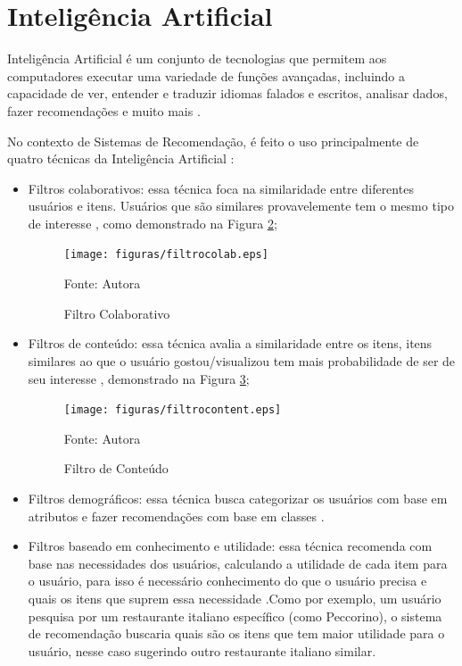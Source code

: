 \section{Inteligência Artificial}\label{sec:ia}

Inteligência Artificial é um conjunto de tecnologias que permitem aos computadores executar uma variedade de 
funções avançadas, incluindo a capacidade de ver, entender e traduzir idiomas falados e escritos, analisar dados, 
fazer recomendações e muito mais \cite{Suleimenov}.

No contexto de Sistemas de Recomendação, é feito o uso principalmente de quatro técnicas da Inteligência Artificial 
\cite{stratoflow-recommendation}:
\begin{itemize}
\item Filtros colaborativos: essa técnica foca na similaridade entre diferentes usuários e itens. Usuários que são
similares provavelemente tem o mesmo tipo de interesse \cite{pham2019recommendation}, como demonstrado na Figura 
\hyperref[fig:filtrocolab]{2};

\begin{figure}[htbp]
    \centering
    \texttt{[image: figuras/filtrocolab.eps]}
    \caption{Filtro Colaborativo}
    \label{fig:filtrocolab}
    \small Fonte: Autora
\end{figure}

\item Filtros de conteúdo: essa técnica avalia a similaridade entre os itens, itens similares ao que o usuário gostou/visualizou
tem mais probabilidade de ser de seu interesse \cite{stratoflow-recommendation}, demonstrado na Figura 
\hyperref[fig:filtrocont]{3};

\begin{figure}[htbp]
    \centering
    \texttt{[image: figuras/filtrocontent.eps]}
    \caption{Filtro de Conteúdo}
    \label{fig:filtrocont}
    \small Fonte: Autora
\end{figure}

\item Filtros demográficos: essa técnica busca categorizar os usuários com base em atributos e fazer recomendações
com base em classes \cite{burke2002hybrid}. 

\item Filtros baseado em conhecimento e utilidade: essa técnica recomenda com base nas necessidades dos usuários, 
calculando a utilidade de cada item para o usuário, para isso é necessário conhecimento do que o usuário precisa e 
quais os itens que suprem essa necessidade \cite{burke2002hybrid}.Como por exemplo, um usuário pesquisa por um restaurante
italiano específico (como Peccorino), o sistema de recomendação buscaria quais são os itens que tem maior utilidade para 
o usuário, nesse caso sugerindo outro restaurante italiano similar.


\end{itemize}
